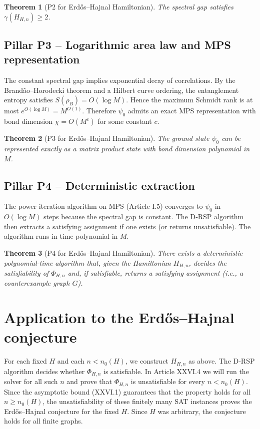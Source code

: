 \documentclass[11pt,a4paper]{article}
\newtheorem{theorem}{Theorem}[section]
\begin{document}
\begin{theorem}[P2 for Erdős–Hajnal Hamiltonian]
The spectral gap satisfies $\gamma(H_{H,n}) \ge 2$.
\end{theorem}

\subsection{Pillar P3 – Logarithmic area law and MPS representation}
The constant spectral gap implies exponential decay of correlations. By the Brandão–Horodecki theorem and a Hilbert curve ordering, the entanglement entropy satisfies $S(\rho_B) = O(\log M)$. Hence the maximum Schmidt rank is at most $e^{O(\log M)} = M^{O(1)}$. Therefore $\psi_0$ admits an exact MPS representation with bond dimension $\chi = O(M^c)$ for some constant $c$.

\begin{theorem}[P3 for Erdős–Hajnal Hamiltonian]
The ground state $\psi_0$ can be represented exactly as a matrix product state with bond dimension polynomial in $M$.
\end{theorem}

\subsection{Pillar P4 – Deterministic extraction}
The power iteration algorithm on MPS (Article I.5) converges to $\psi_0$ in $O(\log M)$ steps because the spectral gap is constant. The D‑RSP algorithm then extracts a satisfying assignment if one exists (or returns unsatisfiable). The algorithm runs in time polynomial in $M$.

\begin{theorem}[P4 for Erdős–Hajnal Hamiltonian]
There exists a deterministic polynomial‑time algorithm that, given the Hamiltonian $H_{H,n}$, decides the satisfiability of $\Phi_{H,n}$ and, if satisfiable, returns a satisfying assignment (i.e., a counterexample graph $G$).
\end{theorem}

\section{Application to the Erdős–Hajnal conjecture}
For each fixed $H$ and each $n < n_0(H)$, we construct $H_{H,n}$ as above. The D‑RSP algorithm decides whether $\Phi_{H,n}$ is satisfiable. In Article XXVI.4 we will run the solver for all such $n$ and prove that $\Phi_{H,n}$ is unsatisfiable for every $n < n_0(H)$. Since the asymptotic bound (XXVI.1) guarantees that the property holds for all $n \ge n_0(H)$, the unsatisfiability of these finitely many SAT instances proves the Erdős–Hajnal conjecture for the fixed $H$. Since $H$ was arbitrary, the conjecture holds for all finite graphs.
\end{document}
